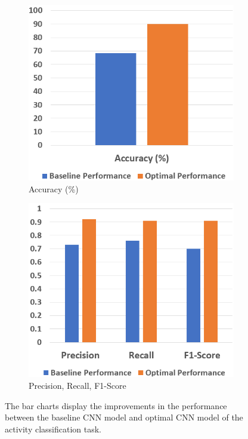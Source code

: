 \documentclass{l4proj}
\begin{document}
\begin{figure}[h]
   \centering
   \begin{subfigure}{0.4\textwidth}
        \includegraphics[width=\textwidth]{images/activity-configuration-comparison-barchart1.png}
        \caption{Accuracy (\%)}
        \label{fig:activity-configuration-comparison-barchart1}
    \end{subfigure}
    \qquad
    \begin{subfigure}{0.4\textwidth}
        \includegraphics[width=\textwidth]{images/activity-configuration-comparison-barchart2.png}
        \caption{Precision, Recall, F1-Score}
        \label{fig:activity-configuration-comparison-barchart2}
    \end{subfigure}
  \caption{The bar charts display the improvements in the performance between the baseline CNN model and optimal CNN model of the activity classification task.}
  \label{fig:activity-configuration-comparison}
\end{figure}
\end{document}
